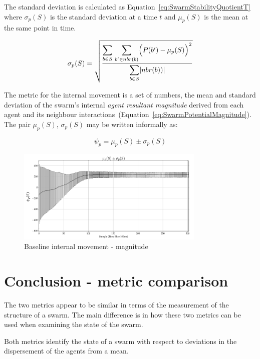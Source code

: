 \documentclass[10pt,journal,letterpaper,twoside]{IEEEtran}
\begin{document}
The standard deviation is calculated as Equation~\ref{eq:SwarmStabilityQuotientT} where $\sigma_p(S)$ is the standard deviation at a time $t$ and $\mu_p(S)$ is the mean at the same point in time. 

\begin{equation}
\label{eq:SwarmStabilityQuotientT}
\sigma_p(S) = \sqrt{\frac{\mathlarger{\sum_{b \in S}}~\mathlarger{\sum_{b' \in nbr(b)}}\Big(P(b')-\mu_p(S)\Big)^2}{\mathlarger{\sum_{b \in S}}|nbr(b))|}}
\end{equation}

The metric for the internal movement is a set of numbers, the mean and standard deviation of the swarm's internal \textit{agent resultant magnitude} derived from each agent and its neighbour interactions~(Equation~\ref{eq:SwarmPotentialMagnitude}). The pair $\mu_p(S)$, $\sigma_p(S)$ may be written informally as: 

\begin{equation}
\label{eq:SwarmPotentialMagnitude}
\psi_p = \mu_p(S)\pm \sigma_p(S)
\end{equation}

\begin{figure}[H]
\begin{center}
\includegraphics[width=9cm]{figures/BaselineMagnitude1}
\end{center}
\caption{Baseline internal movement - magnitude\label{coord:BaselineMagnitude1}}
\end{figure}

\section{Conclusion - metric comparison\label{metric:MagnitudeDistanceComparison}}
The two metrics appear to be similar in terms of the measurement of the structure of a swarm. The main difference is in how these two metrics can be used when examining the state of the swarm.

Both metrics identify the state of a swarm with respect to deviations in the dispersement of the agents from a mean. 
\end{document}
